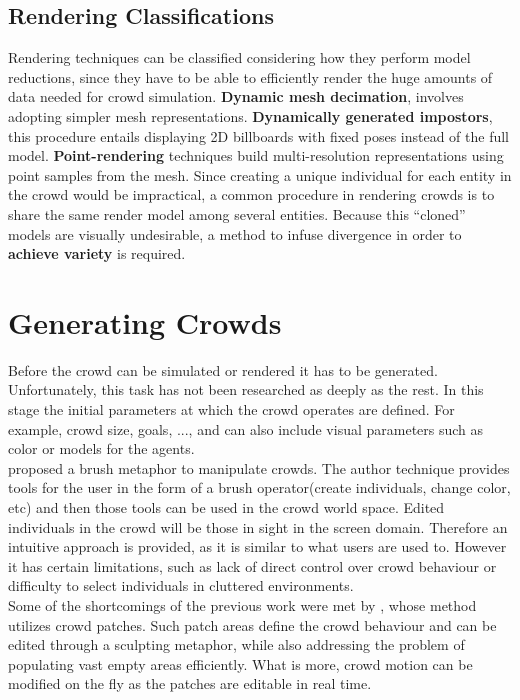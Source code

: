 \documentclass[6pt]{article} %
\begin{document}
\begin{multicols}{2}
\subsection{Rendering Classifications}
\label{subsec:RenderingClassification}

Rendering techniques can be classified considering how they perform model reductions, since they have to be able to efficiently render the huge amounts of data needed for crowd simulation.
\textbf{Dynamic mesh decimation}, involves adopting simpler mesh representations.
\textbf{Dynamically generated impostors}, this procedure entails displaying 2D billboards with fixed poses instead of the full model.
\textbf{Point-rendering} techniques build multi-resolution representations using point samples from the mesh.
Since creating a unique individual for each entity in the crowd would be impractical, a common procedure in rendering crowds is to share the same render model among several entities.
Because this ``cloned'' models are visually undesirable, a method to infuse divergence in order to \textbf{achieve variety} is required. 

\section{Generating Crowds}

Before the crowd can be simulated or rendered it has to be generated.
Unfortunately, this task has not been researched as deeply as the rest.
In this stage the initial parameters at which the crowd operates are defined.
For example, crowd size, goals, ..., and can also include visual parameters such as color or models for the agents.\\

\cite{Ulicny2004} proposed a brush metaphor to manipulate crowds.
The author technique provides tools for the user in the form of a brush operator(create individuals, change color, etc) and then those tools can be used in the crowd world space.
Edited individuals in the crowd will be those in sight in the screen domain.
Therefore an intuitive approach is provided, as it is similar to what users are used to.
However it has certain limitations, such as lack of direct control over crowd behaviour or difficulty to select individuals in cluttered environments.\\

Some of the shortcomings of the previous work were met by \cite{Jordao2014}, whose method utilizes crowd patches.
Such patch areas define the crowd behaviour and can be edited through a sculpting metaphor, while also addressing the problem of populating vast empty areas efficiently.
What is more, crowd motion can be modified on the fly as the patches are editable in real time.


\end{multicols}
\end{document}
